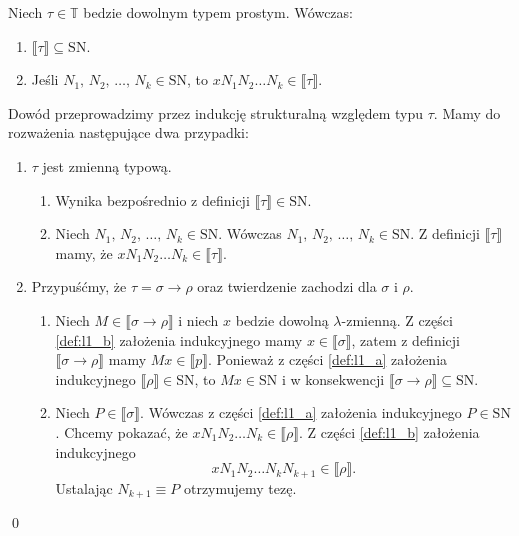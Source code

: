 \begin{lemat}\label{thm:sn_lemat1}
  Niech \(\tau\in\mathbb{T}\) bedzie dowolnym typem prostym. Wówczas:
  \begin{enumerate}[label=(\arabic*)]
    \setlength\itemsep{0em}
    \item \(\llbracket \tau \rrbracket  \subseteq \mathrm{SN}\).\label{def:l1_a}
    \item Jeśli \(N_1,\,N_2,\,\dots,\,N_k\in\mathrm{SN}\), to \(xN_1 N_2 \dots N_k \in \llbracket \tau \rrbracket\).\label{def:l1_b}
  \end{enumerate}
\end{lemat}
\begin{dowod}
  Dowód przeprowadzimy przez indukcję strukturalną względem typu \(\tau\). Mamy do rozważenia następujące dwa przypadki:
  \begin{enumerate}[label=(\alph*)]
    \setlength\itemsep{0em}
    \item \(\tau\) jest zmienną typową.
     \begin{enumerate}[label=(\arabic*)]
      \setlength\itemsep{0em}
     
        \item Wynika bezpośrednio z definicji \(\llbracket \tau \rrbracket\in \mathrm{SN}\). 
         
        \item Niech \(N_1,\,N_2,\,\dots,\,N_k \in \mathrm{SN}\). Wówczas \(N_1,\,N_2,\,\dots,\,N_k\in\mathrm{SN}\). Z definicji \(\llbracket \tau \rrbracket\) mamy, że \(xN_1 N_2 \dots N_k \in\llbracket \tau \rrbracket\).
      \end{enumerate}

    \item Przypuśćmy, że \(\tau=\sigma\to\rho\) oraz twierdzenie zachodzi dla \(\sigma\) i \(\rho\).
    \begin{enumerate}[label=(\arabic*)]
    \setlength\itemsep{0em}

    \item Niech \(M\in\llbracket \sigma \to \rho\rrbracket\) i niech \(x\) bedzie dowolną \(\lambda\)-zmienną. Z części \ref{def:l1_b} założenia indukcyjnego mamy \(x\in\llbracket \sigma \rrbracket\), zatem z definicji \(\llbracket \sigma\to\rho\rrbracket\) mamy \(Mx\in\llbracket p\rrbracket\). Ponieważ z części \ref{def:l1_a} założenia indukcyjnego \(\llbracket\rho\rrbracket\in\mathrm{SN}\), to \(Mx\in\mathrm{SN}\) i w konsekwencji \(\llbracket\sigma\to\rho\rrbracket\subseteq \mathrm{SN}\).
    \item Niech \(P\in\llbracket \sigma \rrbracket\). Wówczas z części \ref{def:l1_a} założenia indukcyjnego \(P\in\mathrm{SN}\). Chcemy pokazać, że \(xN_1 N_2 \dots N_k \in \llbracket \rho \rrbracket\). Z części \ref{def:l1_b} założenia indukcyjnego \[xN_1 N_2 \dots N_k N_{k+1} \in \llbracket \rho \rrbracket.\] Ustalając \(N_{k+1}\equiv P\) otrzymujemy tezę.
     \end{enumerate}
  \end{enumerate}
  \qed
\end{dowod}

